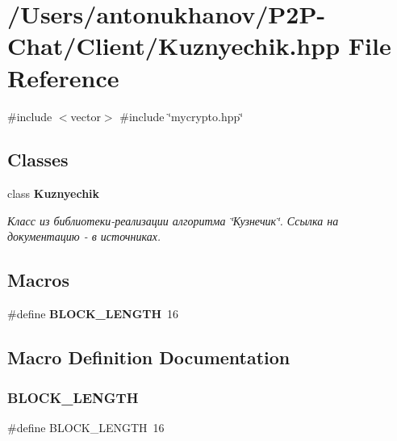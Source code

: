\section{/\+Users/antonukhanov/\+P2\+P-\/\+Chat/\+Client/\+Kuznyechik.hpp File Reference}
\label{_kuznyechik_8hpp}
{\ttfamily \#include $<$vector$>$}\newline
{\ttfamily \#include \char`\"{}mycrypto.\+hpp\char`\"{}}\newline
\subsection*{Classes}
\begin{DoxyCompactItemize}
\item 
class \textbf{ Kuznyechik}
\begin{DoxyCompactList}\small\item\em Класс из библиотеки-\/реализации алгоритма \char`\"{}Кузнечик\char`\"{}. Ссылка на документацию -\/ в источниках. \end{DoxyCompactList}\end{DoxyCompactItemize}
\subsection*{Macros}
\begin{DoxyCompactItemize}
\item 
\#define \textbf{ B\+L\+O\+C\+K\+\_\+\+L\+E\+N\+G\+TH}~16
\end{DoxyCompactItemize}


\subsection{Macro Definition Documentation}
\mbox{\label{_kuznyechik_8hpp_a22a79078d4bc53268ab86f316856248f}} 
\subsubsection{B\+L\+O\+C\+K\+\_\+\+L\+E\+N\+G\+TH}
{\footnotesize\ttfamily \#define B\+L\+O\+C\+K\+\_\+\+L\+E\+N\+G\+TH~16}

